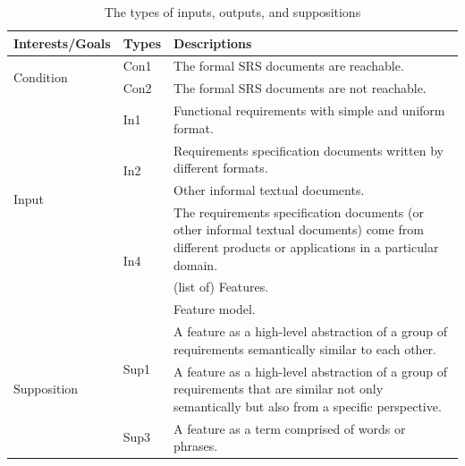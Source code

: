 \documentclass[graybox]{svmult}
\begin{document}
\begin{table}[]
\centering
\caption{The types of inputs, outputs, and suppositions}
\label{tab:types_ios}
\begin{tabular}{p{2.2cm}|p{1cm}|p{8cm}}
\toprule
Interests/Goals                         & Types   & Descriptions                                                                                                                                  \\ \midrule

\multirow{2}{*}{Condition} & Con1 & The formal SRS documents are reachable.                                          \\ \cline{2-3} 

        & Con2 & The formal SRS documents are not reachable. \\ \hline
\multirow{5}{*}{Input}       & In1  & Functional requirements with simple and uniform format.                                                                                       \\ \cline{2-3} 
                             & \multirow{2}{*}{In2}  & Requirements specification documents written by different formats.                                                                                          \\ \cline{2-3} 
                             & In3  &  Other informal textual documents.                                                         \\ \cline{2-3} 
                             & \multirow{3}{*}{In4}   & The requirements specification documents (or other informal textual documents) come from different products or applications in a particular domain.                                                                                                               \\ \hline
\multirow{3}{*}{Output}      & Out1 & (list of) Features.                                                                                                                                     \\ \cline{2-3} 
                             & Out2 & Feature model.                                                                                                                                \\ \hline
\multirow{6}{*}{Supposition} & \multirow{2}{*}{Sup1} & A feature as a high-level abstraction of a group of requirements semantically similar to each other.                                          \\ \cline{2-3} 
                             & \multirow{3}{*}{Sup2} & A feature as a high-level abstraction of a group of requirements that are similar not only semantically but also from a specific perspective. \\ \cline{2-3} 
                             & Sup3 & A feature as a term comprised of words or phrases.                                                                                            \\ \bottomrule                             
\end{tabular}
\end{table}
\end{document}
